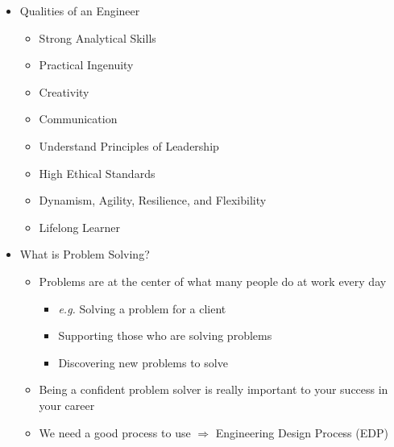 \begin{itemize}

  \item Qualities of an Engineer

    \begin{itemize}

      \item Strong Analytical Skills

      \item Practical Ingenuity

      \item Creativity

      \item Communication

      \item Understand Principles of Leadership

      \item High Ethical Standards

      \item Dynamism, Agility, Resilience, and Flexibility

      \item Lifelong Learner

    \end{itemize}

  \item What is Problem Solving?

    \begin{itemize}

      \item Problems are at the center of what many people do at work every day

        \begin{itemize}

          \item \textit{e.g.} Solving a problem for a client

          \item Supporting those who are solving problems

          \item Discovering new problems to solve

        \end{itemize}

      \item Being a confident problem solver is really important to your success in your career

      \item We need a good process to use $\Rightarrow$ Engineering Design Process (EDP)


\end{itemize}
\end{itemize}
